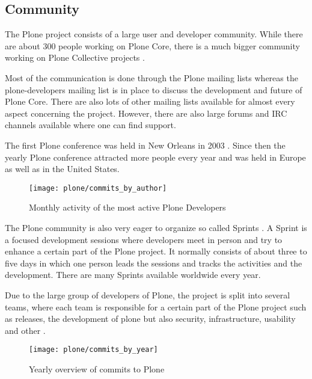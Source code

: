 
\subsection{Community} %
\label{sub:Community}

The Plone project consists of a large user and developer community. While there
are about 300 people working on Plone Core, there is a much bigger community
working on Plone Collective projects
\cite{Aspeli2005,PloneOhlohFactoids,PloneCommunityProcesses}.

Most of the communication is done through the Plone mailing lists whereas the
plone-developers mailing list is in place to discuss the development and future
of Plone Core. There are also lots of other mailing lists available for almost
every aspect concerning the project. However, there are also large forums and
\ac{IRC} channels available where one can find support.

The first Plone conference was held in New Orleans in 2003
\cite{PloneConferences}. Since then the yearly Plone conference attracted more
people every year and was held in Europe as well as in the United States.

\begin{figure}[htbp]
  \centering
  \texttt{[image: plone/commits\_by\_author]}
  \caption{Monthly activity of the most active Plone Developers}
\end{figure}

The Plone community is also very eager to organize so called Sprints
\cite{PloneSprints}. A Sprint is a focused development sessions where
developers meet in person and try to enhance a certain part of the Plone
project. It normally consists of about three to five days in which one person
leads the sessions and tracks the activities and the development. There are
many Sprints available worldwide every year.

Due to the large group of developers of Plone, the project is split into
several teams, where each team is responsible for a certain part of the Plone
project such as releases, the development of plone but also security,
infrastructure, usability and other
\cite{PloneFounders,PloneReleaseManagers,PloneFrameworkTeam,PloneContribute}.

\begin{figure}[htbp]
  \centering
  \texttt{[image: plone/commits\_by\_year]}
  \caption{Yearly overview of commits to Plone}
\end{figure}


